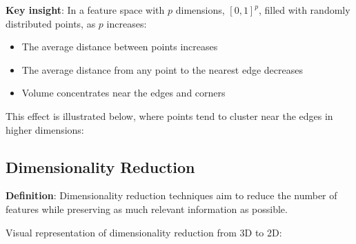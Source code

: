 \documentclass[12pt]{article}
\begin{document}
\textbf{Key insight}: In a feature space with $p$ dimensions, $[0,1]^p$, filled with randomly distributed points, as $p$ increases:
\begin{itemize}
    \item The average distance between points increases
    \item The average distance from any point to the nearest edge decreases
    \item Volume concentrates near the edges and corners
\end{itemize}

This effect is illustrated below, where points tend to cluster near the edges in higher dimensions:

\begin{center}
\end{center}

\subsection{Dimensionality Reduction}
\textbf{Definition}: Dimensionality reduction techniques aim to reduce the number of features while preserving as much relevant information as possible.

Visual representation of dimensionality reduction from 3D to 2D:
\end{document}

